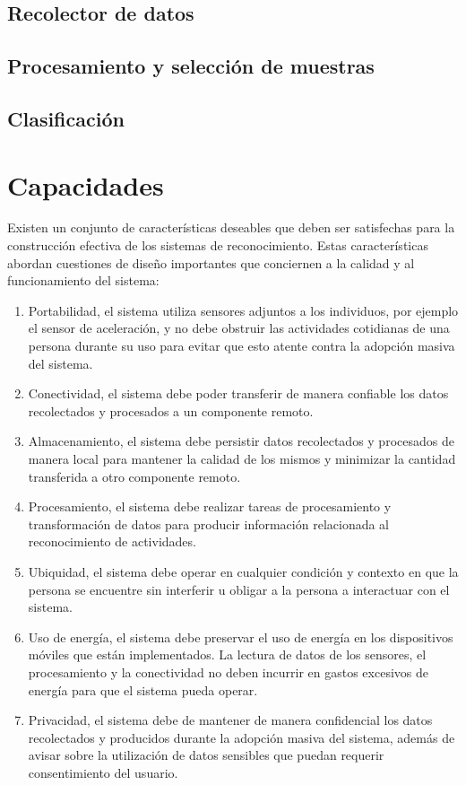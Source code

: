 \subsection{Recolector de datos}

\subsection{Procesamiento y selección de muestras}

\subsection{Clasificación}

\section{Capacidades}

Existen un conjunto de características deseables que deben ser satisfechas
para la construcción efectiva de los sistemas de reconocimiento. Estas
características abordan cuestiones de diseño importantes que conciernen
a la calidad y al funcionamiento del sistema:
\begin{enumerate}
\item Portabilidad, el sistema utiliza sensores adjuntos a los individuos,
por ejemplo el sensor de aceleración, y no debe obstruir las actividades
cotidianas de una persona durante su uso para evitar que esto atente
contra la adopción masiva del sistema. 
\item Conectividad, el sistema debe poder transferir de manera confiable
los datos recolectados y procesados a un componente remoto. 
\item Almacenamiento, el sistema debe persistir datos recolectados y procesados
de manera local para mantener la calidad de los mismos y minimizar
la cantidad transferida a otro componente remoto.
\item Procesamiento, el sistema debe realizar tareas de procesamiento y
transformación de datos para producir información relacionada al reconocimiento
de actividades.
\item Ubiquidad, el sistema debe operar en cualquier condición y contexto
en que la persona se encuentre sin interferir u obligar a la persona
a interactuar con el sistema.
\item Uso de energía, el sistema debe preservar el uso de energía en los
dispositivos móviles que están implementados. La lectura de datos
de los sensores, el procesamiento y la conectividad no deben incurrir
en gastos excesivos de energía para que el sistema pueda operar.
\item Privacidad, el sistema debe de mantener de manera confidencial los
datos recolectados y producidos durante la adopción masiva del sistema,
además de avisar sobre la utilización de datos sensibles que puedan
requerir consentimiento del usuario.
\end{enumerate}


